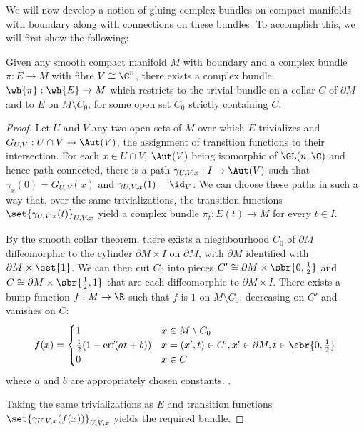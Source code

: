 \documentclass[\PRJWD/Thick_TQFTs_and_Quantum_Information.tex]{subfiles}
\begin{document}
We will now develop a notion of gluing complex bundles on compact manifolds with
boundary along with connections on these bundles. To accomplish this, we will
first show the following:
\begin{thm}\label{thm:bundle_gluing}
Given any smooth compact manifold $M$ with boundary and a complex bundle
$\pi : E \to M$ with fibre $V \cong \C^n$, there exists a complex bundle
$\wh{\pi} : \wh{E} \to M$ which restricts to the trivial bundle on a collar $C$
of $\partial M$ and to $E$ on $M \setminus C_0$, for some open set $C_0$
strictly containing $C$.
\end{thm}
\begin{proof}
Let $U$ and $V$ any two open sets of $M$ over which $E$ trivializes and
$G_{U, V} : U \cap V \to \Aut(V)$, the assignment of transition functions to
their intersection. For each $x \in U \cap V$, $\Aut(V)$ being isomorphic of
$\GL(n, \C)$ and hence path-connected, there is a path
$\gamma_{U, V, x} : I \to \Aut(V)$ such that $\gamma_{x}(0) = G_{U, V}(x)$ and
$\gamma_{U, V, x}(1) = \id_V$. We can choose these paths in such a way that,
over the same trivializations, the transition functions
$\set{\gamma_{U, V, x}(t)}_{U, V, x}$ yield a complex bundle
$\pi_t : E(t) \to M$ for every $t \in I$.

By the smooth collar theorem, there exists a nieghbourhood $C_0$ of $\partial M$
diffeomorphic to the cylinder $\partial M \times I$ on $\partial M$,
with $\partial M$ identified with $\partial M \times \set{1}$.
We can then cut $C_0$ into pieces
$C' \cong \partial M \times \sbr{0, \frac{1}{2}}$ and
$C \cong \partial M \times \sbr{\frac{1}{2}, 1}$ that are each diffeomorphic to
$\partial M \times I$. There exists a bump function $f : M \to \R$ such that
$f$ is $1$ on $M \setminus C_0$, decreasing on $C'$ and vanishes on $C$:
\[
  f(x) = \begin{cases}
    1 & x \in M \setminus C_0 \\
    \frac{1}{2}(1 - \text{erf}(at + b))
      & x = (x', t) \in C', x' \in \partial M, t \in \sbr{0, \frac{1}{2}} \\
    0 & x \in C
  \end{cases}
\]
where $a$ and $b$ are appropriately chosen constants.
.

Taking the same trivializations as $E$ and transition functions
$\set{\gamma_{U, V, x}(f(x))}_{U, V, x}$ yields the required bundle.
\end{proof}
\end{document}
